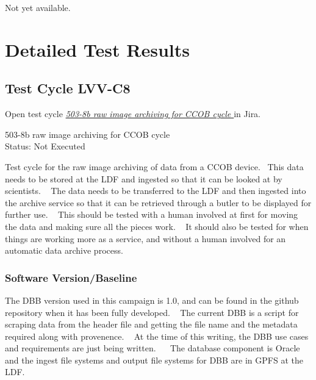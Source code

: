 \documentclass[DM,lsstdraft,STR,toc]{lsstdoc}
\begin{document}
Not yet available.

\newpage
\section{Detailed Test Results}
\label{sect:detailedtestresults}


  \subsection{Test Cycle LVV-C8 }

Open test cycle {\it \href{https://jira.lsstcorp.org/secure/Tests.jspa#/testrun/LVV-C8}{503-8b raw image archiving for CCOB cycle
}} in Jira.

  503-8b raw image archiving for CCOB cycle
\\
  Status: Not Executed

  Test cycle for the raw image archiving of data from a CCOB device. ~This
data needs to be stored at the LDF and ingested so that it can be looked
at by scientists. ~ The data needs to be transferred to the LDF and then
ingested into the archive service so that it can be retrieved through a
butler to be displayed for further use. ~ This should be tested with a
human involved at first for moving the data and making sure all the
pieces work. ~ It should also be tested for when things are working more
as a service, and without a human involved for an automatic data archive
process.\\[2\baselineskip]


  \subsubsection{Software Version/Baseline}
    The DBB version used in this campaign is 1.0, and can be found in the
github repository when it has been fully developed. ~ The current DBB is
a script for scraping data from the header file and getting the file
name and the metadata required along with provenence. ~ At the time of
this writing, the DBB use cases and requirements are just being written.
~ ~The database component is Oracle and the ingest file systems and
output file systems for DBB are in GPFS at the LDF. ~
\end{document}
